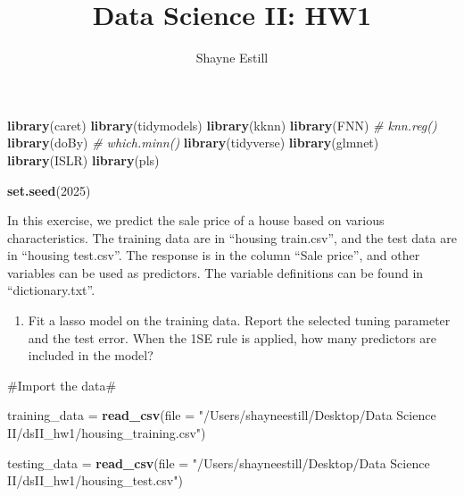 \documentclass[
]{article}
\title{Data Science II: HW1}
\author{Shayne Estill}
\date{}
\newenvironment{Shaded}{\begin{snugshade}}{\end{snugshade}}
\newcommand{\AttributeTok}[1]{\textcolor[rgb]{0.13,0.29,0.53}{#1}}
\newcommand{\CommentTok}[1]{\textcolor[rgb]{0.56,0.35,0.01}{\textit{#1}}}
\newcommand{\DecValTok}[1]{\textcolor[rgb]{0.00,0.00,0.81}{#1}}
\newcommand{\FunctionTok}[1]{\textcolor[rgb]{0.13,0.29,0.53}{\textbf{#1}}}
\newcommand{\NormalTok}[1]{#1}
\newcommand{\OtherTok}[1]{\textcolor[rgb]{0.56,0.35,0.01}{#1}}
\newcommand{\StringTok}[1]{\textcolor[rgb]{0.31,0.60,0.02}{#1}}
\providecommand{\tightlist}{%
  \setlength{\itemsep}{0pt}\setlength{\parskip}{0pt}}
\begin{document}
\maketitle

{
\setcounter{tocdepth}{2}
\tableofcontents
}
\begin{Shaded}
\begin{Highlighting}[]
\FunctionTok{library}\NormalTok{(caret)}
\FunctionTok{library}\NormalTok{(tidymodels)}
\FunctionTok{library}\NormalTok{(kknn)}
\FunctionTok{library}\NormalTok{(FNN) }\CommentTok{\# knn.reg()}
\FunctionTok{library}\NormalTok{(doBy) }\CommentTok{\# which.minn()}
\FunctionTok{library}\NormalTok{(tidyverse)}
\FunctionTok{library}\NormalTok{(glmnet)}
\FunctionTok{library}\NormalTok{(ISLR)}
\FunctionTok{library}\NormalTok{(pls)}



\FunctionTok{set.seed}\NormalTok{(}\DecValTok{2025}\NormalTok{)}
\end{Highlighting}
\end{Shaded}

In this exercise, we predict the sale price of a house based on various
characteristics. The training data are in ``housing train.csv'', and the
test data are in ``housing test.csv''. The response is in the column
``Sale price'', and other variables can be used as predictors. The
variable definitions can be found in ``dictionary.txt''.

\begin{enumerate}
\def\labelenumi{(\alph{enumi})}
\tightlist
\item
  Fit a lasso model on the training data. Report the selected tuning
  parameter and the test error. When the 1SE rule is applied, how many
  predictors are included in the model?
\end{enumerate}

\#Import the data\#

\begin{Shaded}
\begin{Highlighting}[]
\NormalTok{training\_data }\OtherTok{=} \FunctionTok{read\_csv}\NormalTok{(}\AttributeTok{file =} \StringTok{"/Users/shayneestill/Desktop/Data Science II/dsII\_hw1/housing\_training.csv"}\NormalTok{)}

\NormalTok{testing\_data }\OtherTok{=} \FunctionTok{read\_csv}\NormalTok{(}\AttributeTok{file =} \StringTok{"/Users/shayneestill/Desktop/Data Science II/dsII\_hw1/housing\_test.csv"}\NormalTok{)}
\end{Highlighting}
\end{Shaded}
\end{document}
